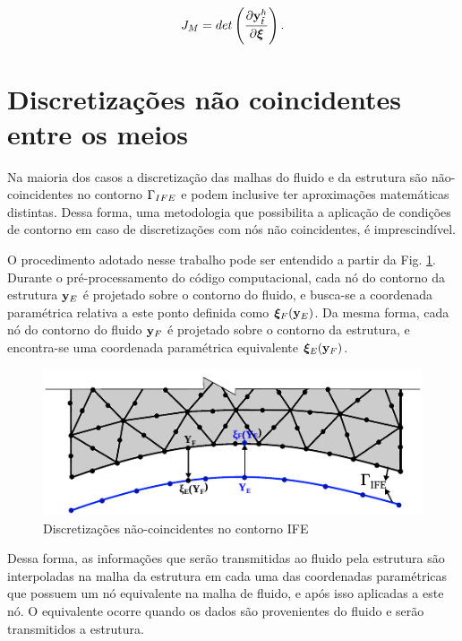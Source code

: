 \documentclass[tese_patricia]{subfiles}
\begin{document}
\begin{align}
	J_{M} = det\left(\frac{\partial\mathbf{y}^h_{\tilde{t}}}{\partial\boldsymbol{\xi}}\right).
\end{align}


\section{Discretizações não coincidentes entre os meios}

Na maioria dos casos a discretização das malhas do fluido e da estrutura são não-coincidentes no contorno $\Gamma_{IFE}$ e podem inclusive ter aproximações matemáticas distintas. Dessa forma, uma metodologia que possibilita a aplicação de condições de contorno em caso de discretizações com nós não coincidentes, é imprescindível. 

O procedimento adotado nesse trabalho pode ser entendido a partir da Fig. \ref{fig:contornoIFE}. Durante o pré-processamento do código computacional, cada nó do contorno da estrutura $\mathbf{y}_E$ é projetado sobre o contorno do fluido, e busca-se a coordenada paramétrica relativa a este ponto definida como $\boldsymbol{\xi}_F (\mathbf{y}_E)$. Da mesma forma, cada nó do contorno do fluido $\mathbf{y}_F$ é projetado sobre o contorno da estrutura, e encontra-se uma coordenada paramétrica equivalente $\boldsymbol{\xi}_E(\mathbf{y}_F)$. 


\begin{figure}[htb!]
	\centering 
	\includegraphics[scale=1.5,trim=0cm 0cm 0cm 0cm, clip=true]{Imagens/Cap7/contornoIFE.pdf}	
	\caption{Discretizações não-coincidentes no contorno IFE}
	\label{fig:contornoIFE}
\end{figure}

Dessa forma, as informações que serão transmitidas ao fluido pela estrutura são interpoladas na malha da estrutura em cada uma das coordenadas paramétricas que possuem um nó equivalente na malha de fluido, e após isso aplicadas a este nó. O equivalente ocorre quando os dados são provenientes do fluido e serão transmitidos a estrutura.
\end{document}
